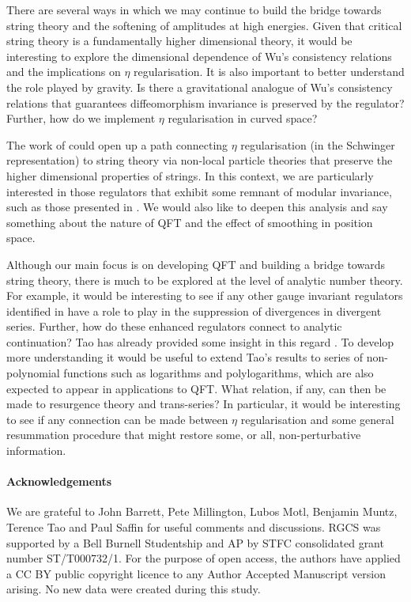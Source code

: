 \documentclass[11pt, letter]{article}
\begin{document}
There are several ways in which we may continue to build the bridge towards string theory and the softening of amplitudes at high energies.  Given that critical string theory is a fundamentally higher dimensional theory, it would be interesting to explore the dimensional dependence of Wu's consistency relations and the implications on $\eta$ regularisation. It is also important to better understand the role played by gravity.  Is there a gravitational analogue of Wu's consistency relations that guarantees diffeomorphism invariance is preserved by the regulator? Further, how do we implement  $\eta$ regularisation in curved space? 

The work of \citep{Abel19,Abel20} could open up a path connecting $\eta$ regularisation (in the Schwinger representation) to string theory via non-local particle theories that preserve the higher dimensional properties of strings.  In this context, we are particularly interested in those regulators  that exhibit some remnant of modular invariance, such as those presented in \citep{Abel21}. We would also like to deepen this analysis and  say something about the nature of QFT and the effect of smoothing in position space. 



Although our main focus is on developing QFT and building a bridge towards string theory, there is much to be explored at the level of analytic number theory. For example, it would be interesting to see if any other gauge invariant regulators identified in \cite{PadillaSmith23} have a role to play in the suppression of divergences in divergent series. Further, how do these enhanced regulators connect to analytic continuation? Tao has already provided some insight in this regard \cite{Tao11}. To develop  more understanding it would be useful to extend Tao's results to series of non-polynomial functions such as logarithms and polylogarithms, which are also expected to appear in applications to QFT. What relation, if any, can then be made to resurgence theory and trans-series? In particular, it would be interesting to see if any connection can be made between $\eta$ regularisation and some general resummation procedure that might restore some, or all, non-perturbative information. 


\paragraph{Acknowledgements} 
We are grateful to John Barrett, Pete Millington, Lubos Motl, Benjamin Muntz, Terence Tao and Paul Saffin for useful comments and discussions. RGCS was supported by a Bell Burnell Studentship and AP  by STFC consolidated grant number ST/T000732/1.  For the purpose of open access, the authors have applied a CC BY public copyright licence to any Author Accepted Manuscript version arising. No new data were created during this study.

\appendix


\end{document}
